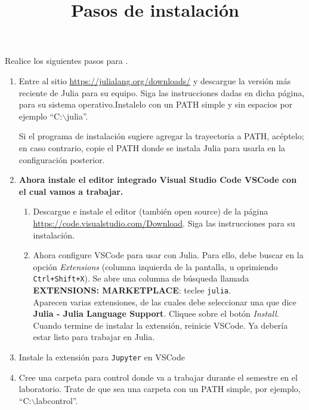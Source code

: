 \documentclass[11pt, a4paper]{article}
\title{\Large \textbf{Pasos de instalación}}
\author{}
\date{}
\begin{document}
	
	\maketitle
	\vspace{-1cm}
	
	\noindent Realice los siguientes pasos para .
	
	\begin{enumerate}[leftmargin=*]
 \item Entre al sitio \url{https://julialang.org/downloads/} y descargue la versión más reciente de Julia  para su equipo. Siga las instrucciones dadas en dicha página, para su sistema operativo.Instalelo con un PATH simple y sin espacios por ejemplo ``C:$\backslash$julia''.
 
 Si el programa de instalación sugiere agregar la trayectoria a PATH, acéptelo; en caso contrario, copie el PATH donde se instala Julia para usarla en la configuración posterior.
			

		
\item \textbf{Ahora instale el editor integrado Visual Studio Code VSCode con el cual vamos a trabajar.}
		\begin{enumerate}[label=\alph*)]

\item Descargue e instale el editor (también open source) de la página \url{https://code.visualstudio.com/Download}. Siga las instrucciones para su instalación.

\item Ahora configure VSCode para usar con Julia. Para ello, debe buscar en la opción \textit{Extensions} (columna izquierda de la pantalla, u oprimiendo \texttt{Ctrl+Shift+X}). Se abre una columna de búsqueda llamada \textbf{EXTENSIONS: MARKETPLACE}: teclee \texttt{julia}.\\
			Aparecen varias extensiones, de las cuales debe seleccionar una que dice \textbf{Julia - Julia Language Support}. Cliquee sobre el botón \textit{Install}. Cuando termine de instalar la extensión, reinicie VSCode. Ya debería estar listo para trabajar en Julia.
		\end{enumerate}

\item Instale la extensión para \texttt{Jupyter} en VSCode 


\item Cree una carpeta para control donde va a trabajar durante el semestre en el laboratorio. Trate de que sea una carpeta con un PATH simple, por ejemplo, ``C:$\backslash$labcontrol''. 


\end{enumerate}
\end{document}
